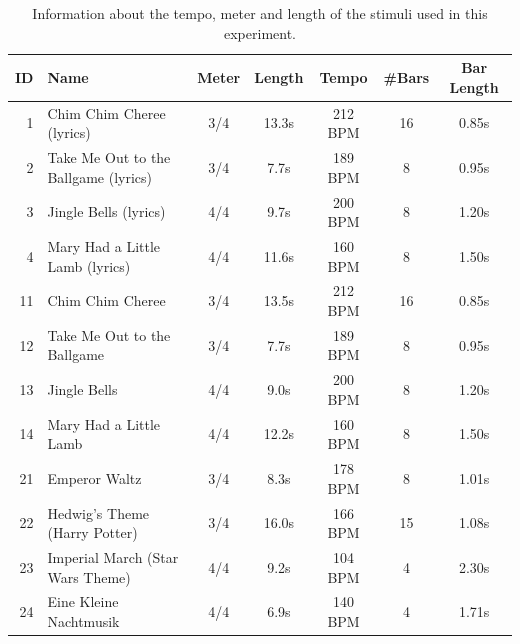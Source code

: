 \begin{table}[t]
\setlength{\tabcolsep}{2.5pt}  %
\renewcommand{\arraystretch}{1}
\centering
\caption{Information about the tempo, meter and length of the stimuli used in this experiment.}
\label{tab:stimuli_information}
{\footnotesize %
\begin{tabularx}{\columnwidth}{r l c c  c c c }
\toprule
ID		& Name							&Meter 	& Length	& Tempo 		&\#Bars	& Bar Length\\
\midrule
1		& Chim Chim Cheree (lyrics)			& 3/4		& 13.3s 			& 212 BPM 	& 16				& 0.85s	\\ %
2		& Take Me Out to the Ballgame (lyrics)	& 3/4		& 7.7s 			& 189 BPM 	& 8				& 0.95s	\\ %
3		& Jingle Bells (lyrics)					& 4/4		& 9.7s 			& 200 BPM 	& 8				& 1.20s	\\ %
4		& Mary Had a Little Lamb (lyrics)		& 4/4		& 11.6s			& 160 BPM 	& 8				& 1.50s	\\ %
11		& Chim Chim Cheree 				& 3/4		& 13.5s	 		& 212 BPM 	& 16				& 0.85s	\\ %
12		& Take Me Out to the Ballgame			& 3/4		& 7.7s 			& 189 BPM 	& 8				& 0.95s	\\ %
13		& Jingle Bells 						& 4/4		& 9.0s 			& 200 BPM 	& 8				& 1.20s	\\ %
14		& Mary Had a Little Lamb				& 4/4		& 12.2s			& 160 BPM 	& 8				& 1.50s	\\ %
21		& Emperor Waltz					& 3/4		& 8.3s 			& 178 BPM 	& 8				& 1.01s	\\ %
22		& Hedwig's Theme (Harry Potter)		& 3/4		& 16.0s	 		& 166 BPM 	& 15				& 1.08s	\\ %
23		& Imperial March (Star Wars Theme)		& 4/4		& 9.2s 			& 104 BPM 	& 4				& 2.30s	\\ %
24		& Eine Kleine Nachtmusik				& 4/4		& 6.9s			& 140 BPM 	& 4				& 1.71s	\\ %
\bottomrule
\end{tabularx}
}
\end{table}

